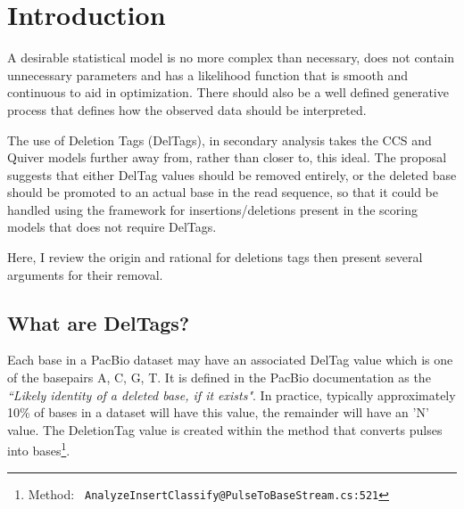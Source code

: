 \documentclass[fleqn,10pt]{SelfArx} %
\begin{document}
\flushbottom %

\maketitle %

\tableofcontents %

\thispagestyle{empty} %


\section*{Introduction} %


A desirable statistical model is no more complex than necessary, does not contain unnecessary parameters and has a likelihood function that is smooth and continuous to aid in optimization.  There should also be a well defined generative process that defines how the observed data should be interpreted.

The use of Deletion Tags (DelTags), in secondary analysis takes the CCS and Quiver models further away from, rather than closer to, this ideal.  The proposal suggests that either DelTag values should be removed entirely, or the deleted base should be promoted to an actual base in the read sequence, so that it could be handled using the framework for insertions/deletions present in the scoring models that does not require DelTags. 

Here, I review the origin and rational for deletions tags then present several arguments for their removal. 



\subsection{What are DelTags?}
Each base in a PacBio dataset may have an associated DelTag value which is one of the basepairs A, C, G, T.  It is defined in the PacBio documentation as the \textit{``Likely identity of a deleted base, if it exists"}.  In practice, typically approximately 10\% of bases in a dataset will have this value, the remainder will have an 'N' value. The DeletionTag value is created within the method that converts pulses into bases\footnote{Method: \texttt{ AnalyzeInsertClassify@PulseToBaseStream.cs:521}}.
\end{document}

